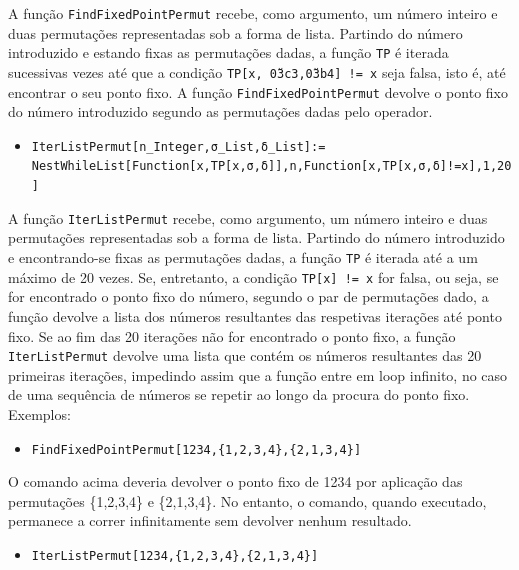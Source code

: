 \documentclass[12pt,a4paper]{article}
\begin{document}
        A função \texttt{FindFixedPointPermut} recebe, como argumento, um número inteiro e duas permutações representadas sob a forma de lista. Partindo do número introduzido e estando fixas as permutações dadas, a função \texttt{TP} é iterada sucessivas vezes até que a condição \texttt{TP[x, \u03c3,\u03b4] != x} seja falsa, isto é, até encontrar o seu ponto fixo. A função \texttt{FindFixedPointPermut} devolve o ponto fixo do número introduzido segundo as permutações dadas pelo operador.

        \begin{itemize}
            \item \texttt{IterListPermut[n\_Integer,σ\_List,δ\_List]:= \\ NestWhileList[Function[x,TP[x,σ,δ]],n,Function[x,TP[x,σ,δ]!=x],1,20]}
        \end{itemize}

        A função \texttt{IterListPermut} recebe, como argumento, um número inteiro e duas permutações representadas sob a forma de lista. Partindo do número introduzido e encontrando-se fixas as permutações dadas, a função \texttt{TP} é iterada até a um máximo de 20 vezes. Se, entretanto, a condição \texttt{TP[x] != x} for falsa, ou seja, se for encontrado o ponto fixo do número, segundo o par de permutações dado, a função devolve a lista dos números resultantes das respetivas iterações até ponto fixo. Se ao fim das 20 iterações não for encontrado o ponto fixo, a função \texttt{IterListPermut} devolve uma lista que contém os números resultantes das 20 primeiras iterações, impedindo assim que a função entre em loop infinito, no caso de uma sequência de números se repetir ao longo da procura do ponto fixo. \\

        Exemplos:
        \begin{itemize}
            \item \texttt{FindFixedPointPermut[1234,\{1,2,3,4\},\{2,1,3,4\}]}
        \end{itemize}

        O comando acima deveria devolver o ponto fixo de 1234 por aplicação das permutações \{1,2,3,4\} e \{2,1,3,4\}. No entanto, o comando, quando executado, permanece a correr infinitamente sem devolver nenhum resultado.

        \begin{itemize}
            \item \texttt{IterListPermut[1234,\{1,2,3,4\},\{2,1,3,4\}]}
        \end{itemize}
\end{document}
